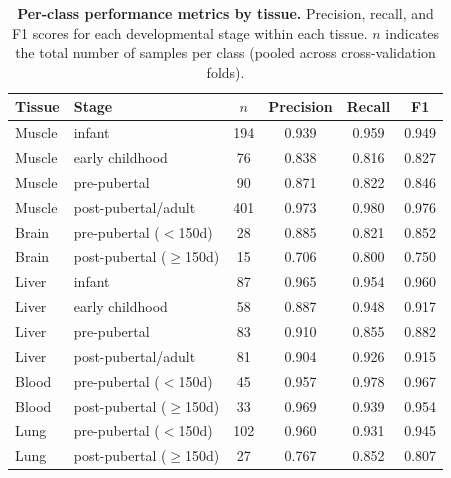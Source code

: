 \documentclass[10pt,a4paper]{article}
\begin{document}
\begin{table}[H]
  \centering
  \caption{\textbf{Per-class performance metrics by tissue.} Precision, recall, and F1 scores for each developmental stage within each tissue. $n$ indicates the total number of samples per class (pooled across cross-validation folds).}
  \label{tab:S2}
  \small
  \begin{tabular}{llcccc}
    \toprule
    Tissue & Stage & $n$ & Precision & Recall & F1 \\
    \midrule
    Muscle & infant & 194 & 0.939 & 0.959 & 0.949 \\
    Muscle & early childhood & 76 & 0.838 & 0.816 & 0.827 \\
    Muscle & pre-pubertal & 90 & 0.871 & 0.822 & 0.846 \\
    Muscle & post-pubertal/adult & 401 & 0.973 & 0.980 & 0.976 \\
    \midrule
    Brain & pre-pubertal ($<$150d) & 28 & 0.885 & 0.821 & 0.852 \\
    Brain & post-pubertal ($\geq$150d) & 15 & 0.706 & 0.800 & 0.750 \\
    \midrule
    Liver & infant & 87 & 0.965 & 0.954 & 0.960 \\
    Liver & early childhood & 58 & 0.887 & 0.948 & 0.917 \\
    Liver & pre-pubertal & 83 & 0.910 & 0.855 & 0.882 \\
    Liver & post-pubertal/adult & 81 & 0.904 & 0.926 & 0.915 \\
    \midrule
    Blood & pre-pubertal ($<$150d) & 45 & 0.957 & 0.978 & 0.967 \\
    Blood & post-pubertal ($\geq$150d) & 33 & 0.969 & 0.939 & 0.954 \\
    \midrule
    Lung & pre-pubertal ($<$150d) & 102 & 0.960 & 0.931 & 0.945 \\
    Lung & post-pubertal ($\geq$150d) & 27 & 0.767 & 0.852 & 0.807 \\
    \bottomrule
  \end{tabular}
\end{table}

\clearpage
\end{document}
